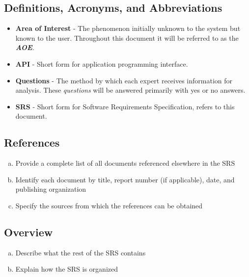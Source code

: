 \documentclass[titlepage]{article}
\begin{document}
		\subsection{Definitions, Acronyms, and Abbreviations}
		\label{sub:definitions_acronyms_and_abbreviations}
		\begin{itemize}
			\item \textbf{Area of Interest} -
			The phenomenon initially unknown to the system but known to the user. 		Throughout this document it will be referred to as the \textit{\textbf{AOE}}.
			\item \textbf{API} - Short form for application programming interface.
			\item \textbf{Questions} - The method by which each expert receives information for analysis. These \textit{questions} will be answered primarily with yes or no answers.
			\item \textbf{SRS} - Short form for Software Requirements Specification, refers to this document.
		\end{itemize}
		
		\subsection{References}
		\label{sub:references}
		\begin{enumerate}[a)]
			\item Provide a complete list of all documents referenced elsewhere in the SRS
			\item Identify each document by title, report number (if applicable), date, and publishing organization
			\item Specify the sources from which the references can be obtained
		\end{enumerate}
		
		\subsection{Overview}
		\label{sub:overview}
		\begin{enumerate}[a)]
			\item Describe what the rest of the SRS contains
			\item Explain how the SRS is organized
		\end{enumerate}
		
		
\end{document}
